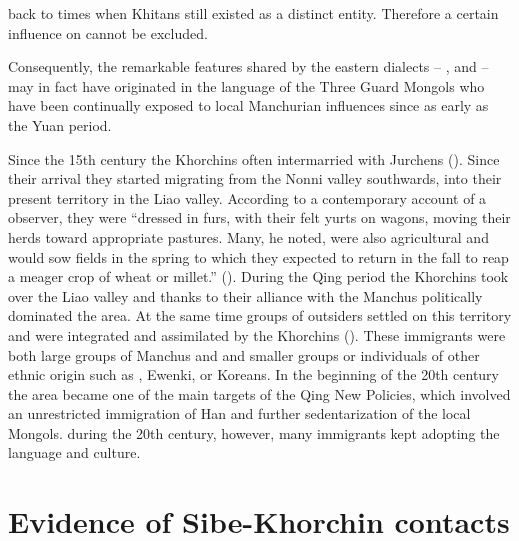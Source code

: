 \documentclass[output=paper,colorlinks,citecolor=brown]{langscibook}
\begin{document}
back to times when Khitans still existed as a distinct entity. Therefore a certain  influence on  cannot be excluded.

Consequently, the remarkable features shared by the eastern  dialects – ,  and  – may in fact have originated in the language of the Three Guard Mongols who have been continually exposed to local Manchurian influences since as early as the Yuan period.

Since the 15th century the Khorchins often intermarried with Jurchens (\citealt[65]{Crossley2006}). Since their arrival they started migrating from the Nonni valley southwards, into their present territory in the Liao valley. According to a contemporary account of a  observer, they were “dressed in furs, with their felt yurts on wagons, moving their herds toward appropriate pastures. Many, he noted, were also agricultural and would sow fields in the spring to which they expected to return in the fall to reap a meager crop of wheat or millet.” (\citealt[66]{Crossley2006}). During the Qing period the Khorchins took over the Liao valley and thanks to their alliance with the Manchus politically dominated the area. At the same time groups of outsiders settled on this territory and were integrated and assimilated by the Khorchins (\citealt[37]{Caidengduoerji2014}). These immigrants were both large groups of Manchus and  and smaller groups or individuals of other ethnic origin such as , Ewenki, or Koreans. In the beginning of the 20th century the  area became one of the main targets of the Qing New Policies, which involved an unrestricted immigration of Han  and further sedentarization of the local Mongols.  during the 20th century, however, many immigrants kept adopting the  language and culture. 

\section{Evidence of Sibe-Khorchin contacts}\label{section9.3}
\end{document}
